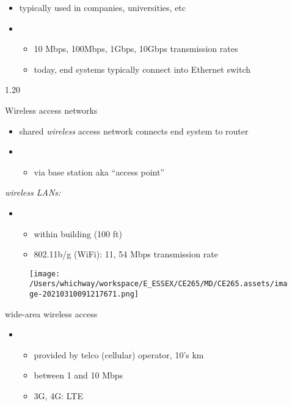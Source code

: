 \documentclass[
]{article}
\begin{document}
\begin{itemize}
\item
  typically used in companies, universities, etc
\item
  \begin{itemize}
  \item
    10 Mbps, 100Mbps, 1Gbps, 10Gbps transmission rates
  \item
    today, end systems typically connect into Ethernet switch
  \end{itemize}
\end{itemize}

1.20

Wireless access networks

\begin{itemize}
\item
  shared \emph{wireless} access network connects end system to router
\item
  \begin{itemize}
  \item
    via base station aka ``access point''
  \end{itemize}
\end{itemize}

\emph{wireless LANs:}

\begin{itemize}
\item
  \begin{itemize}
  \item
    within building (100 ft)
  \item
    802.11b/g (WiFi): 11, 54 Mbps transmission rate
  \end{itemize}
\end{itemize}

\begin{figure}
\centering
\texttt{[image: /Users/whichway/workspace/E\_ESSEX/CE265/MD/CE265.assets/image-20210310091217671.png]}
\caption{}
\end{figure}

wide-area wireless access

\begin{itemize}
\item
  \begin{itemize}
  \item
    provided by telco (cellular) operator, 10's km
  \item
    between 1 and 10 Mbps
  \item
    3G, 4G: LTE
  \end{itemize}
\end{itemize}
\end{document}
